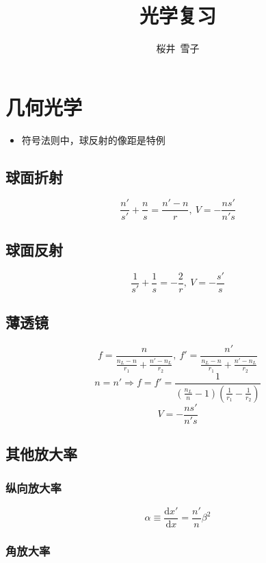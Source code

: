 \documentclass{article}
\title{光学复习}
\author{桜井\ 雪子}
\date{}
\begin{document}
\maketitle

\section{几何光学}

\begin{itemize}
    \item 符号法则中，球反射的像距是特例
\end{itemize}

\subsection{球面折射}

$$
    \frac{n'}{s'}+\frac{n}{s}=\frac{n'-n}{r},\ V=-\frac{ns'}{n's}
$$

\subsection{球面反射}

$$
    \frac{1}{s'}+\frac{1}{s}=-\frac{2}{r},\ V=-\frac{s'}{s}
$$

\subsection{薄透镜}

$$
    f=\frac{n}{\frac{n_L-n}{r_1}+\frac{n'-n_L}{r_2}},\ f'=\frac{n'}{\frac{n_L-n}{r_1}+\frac{n'-n_L}{r_2}}
$$ $$
    n=n'\Rightarrow f=f'=\frac{1}{\left(\frac{n_L}{n}-1\right)\left(\frac{1}{r_1}-\frac{1}{r_2}\right)}
$$ $$
    V=-\frac{ns'}{n's}
$$

\subsection{其他放大率}

\subsubsection{纵向放大率}

$$
    \alpha\equiv\frac{\mathrm{d}x'}{\mathrm{d}x}=\frac{n'}{n}\beta^2
$$

\subsubsection{角放大率}
\end{document}
